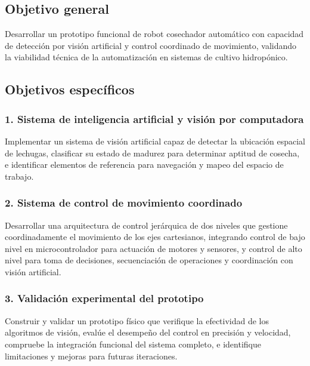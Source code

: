 
\subsection*{Objetivo general}

Desarrollar un prototipo funcional de robot cosechador automático con capacidad de detección por visión artificial y control coordinado de movimiento, validando la viabilidad técnica de la automatización en sistemas de cultivo hidropónico.

\subsection*{Objetivos específicos}

\subsubsection*{1. Sistema de inteligencia artificial y visión por computadora}

Implementar un sistema de visión artificial capaz de detectar la ubicación espacial de lechugas, clasificar su estado de madurez para determinar aptitud de cosecha, e identificar elementos de referencia para navegación y mapeo del espacio de trabajo.

\subsubsection*{2. Sistema de control de movimiento coordinado}

Desarrollar una arquitectura de control jerárquica de dos niveles que gestione coordinadamente el movimiento de los ejes cartesianos, integrando control de bajo nivel en microcontrolador para actuación de motores y sensores, y control de alto nivel para toma de decisiones, secuenciación de operaciones y coordinación con visión artificial.

\subsubsection*{3. Validación experimental del prototipo}

Construir y validar un prototipo físico que verifique la efectividad de los algoritmos de visión, evalúe el desempeño del control en precisión y velocidad, compruebe la integración funcional del sistema completo, e identifique limitaciones y mejoras para futuras iteraciones.
